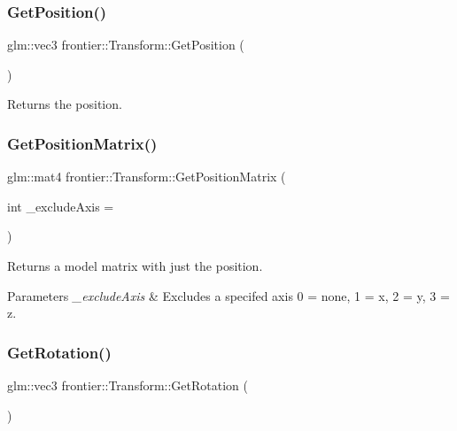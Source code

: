 \subsubsection{\texorpdfstring{Get\+Position()}{GetPosition()}}
{\footnotesize\ttfamily glm\+::vec3 frontier\+::\+Transform\+::\+Get\+Position (\begin{DoxyParamCaption}{ }\end{DoxyParamCaption})}



Returns the position. 

\mbox{\label{classfrontier_1_1_transform_ab6bff40a457322589a7f8a1dc92a5c42}} 
\subsubsection{\texorpdfstring{Get\+Position\+Matrix()}{GetPositionMatrix()}}
{\footnotesize\ttfamily glm\+::mat4 frontier\+::\+Transform\+::\+Get\+Position\+Matrix (\begin{DoxyParamCaption}\item[{int}]{\+\_\+exclude\+Axis = {} }\end{DoxyParamCaption})}



Returns a model matrix with just the position. 


\begin{DoxyParams}{Parameters}
{\em \+\_\+exclude\+Axis} & Excludes a specifed axis 0 = none, 1 = x, 2 = y, 3 = z. \\
\hline
\end{DoxyParams}
\mbox{\label{classfrontier_1_1_transform_a1be9d719815ece4e26513567ef2ac23b}} 
\subsubsection{\texorpdfstring{Get\+Rotation()}{GetRotation()}}
{\footnotesize\ttfamily glm\+::vec3 frontier\+::\+Transform\+::\+Get\+Rotation (\begin{DoxyParamCaption}{ }\end{DoxyParamCaption})}



